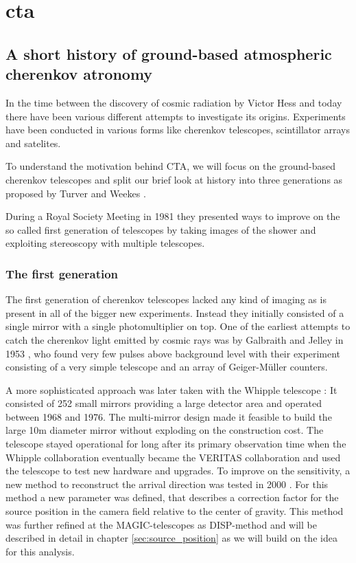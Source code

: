 \chapter{cta}
\label{cta}


\section{A short history of ground-based atmospheric cherenkov atronomy}
In the time between the discovery of cosmic radiation by Victor Hess \cite{Hess:1912srp}
and today there have been various different attempts to investigate its origins.
Experiments have been conducted in various forms like cherenkov telescopes, scintillator 
arrays and satelites.

To understand the motivation behind CTA, 
we will focus on the ground-based 
cherenkov telescopes and split our brief look at history 
into three generations as proposed by Turver and Weekes \cite{turver1980}.

During a Royal Society Meeting in 1981 they presented ways to improve on
the so called first generation of telescopes by taking images of the shower
and exploiting stereoscopy with multiple telescopes.

\subsection{The first generation}
The first generation of cherenkov telescopes 
lacked any kind of imaging as is present in all of the bigger new experiments.
Instead they initially consisted of a single mirror with a single photomultiplier on top.
One of the earliest attempts to catch the cherenkov light emitted by cosmic rays 
was by Galbraith and Jelley in 1953 \cite{1953Natur.171..349G}, who found very few pulses
above background level with their experiment consisting of a very simple 
telescope and an array of Geiger-Müller counters.

A more sophisticated approach was later taken with the Whipple telescope \cite{whipple1968}:
It consisted of 252 small mirrors providing a large detector area and operated between 
1968 and 1976. The multi-mirror design made it feasible to build the large 10m diameter 
mirror without exploding on the construction cost.
The telescope stayed operational for long after its primary observation time
when the Whipple collaboration eventually became the VERITAS collaboration 
and used the telescope to test new hardware and upgrades.
To improve on the sensitivity, a new method to reconstruct 
the arrival direction was tested in 2000 \cite{Lessard:2000yf}.
For this method a new parameter was defined, that describes a correction factor 
for the source position in the camera field relative to the center of gravity.
This method was further refined at the MAGIC-telescopes as DISP-method and will be described 
in detail in chapter \ref{sec:source_position} as we will build on the idea
for this analysis.

